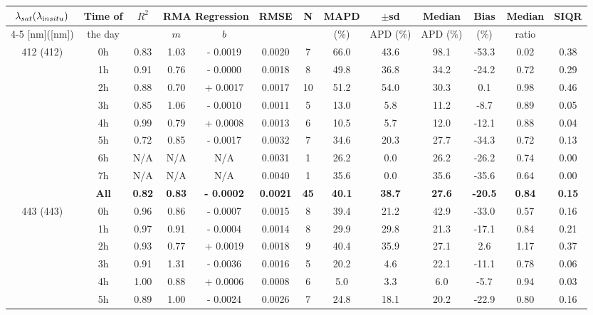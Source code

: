 \documentclass[preview]{standalone}
\begin{document}
\tiny

\tiny
\centering
\begin{tabular}{ccccccccccccc} 
 \hline 
$\lambda_{sat} (\lambda_{\text in situ})$ & Time of & $R^2$ & \multicolumn{2}{c}{RMA Regression} & RMSE & N & MAPD & $\pm$sd & Median & Bias & Median & SIQR \\ \cline{4-5}
[nm]([nm])                  &  the day            &         & $m$     & $b$     &             &     & ($\%$)  & APD ($\%$)  & APD ($\%$)  & ($\%$)   & ratio   &         \\ \hline 
\multirow{9}{*}{412 (412)} & 0h & 0.83 & 1.03 & - 0.0019 & 0.0020 &  7 & 66.0 & 43.6 & 98.1 & -53.3 & 0.02 & 0.38 \\ 
 & 1h & 0.91 & 0.76 & - 0.0000 & 0.0018 &  8 & 49.8 & 36.8 & 34.2 & -24.2 & 0.72 & 0.29 \\ 
 & 2h & 0.88 & 0.70 & + 0.0017 & 0.0017 & 10 & 51.2 & 54.0 & 30.3 & 0.1 & 0.98 & 0.46 \\ 
 & 3h & 0.85 & 1.06 & - 0.0010 & 0.0011 &  5 & 13.0 & 5.8 & 11.2 & -8.7 & 0.89 & 0.05 \\ 
 & 4h & 0.99 & 0.79 & + 0.0008 & 0.0013 &  6 & 10.5 & 5.7 & 12.0 & -12.1 & 0.88 & 0.04 \\ 
 & 5h & 0.72 & 0.85 & - 0.0017 & 0.0032 &  7 & 34.6 & 20.3 & 27.7 & -34.3 & 0.72 & 0.13 \\ 
 & 6h & N/A & N/A & N/A & 0.0031 &  1 & 26.2 & 0.0 & 26.2 & -26.2 & 0.74 & 0.00\\ 
 & 7h & N/A & N/A & N/A & 0.0040 &  1 & 35.6 & 0.0 & 35.6 & -35.6 & 0.64 & 0.00\\ \cline{2-13}
 & \textbf{All}& \textbf{0.82} & \textbf{0.83} & \textbf{- 0.0002} & \textbf{0.0021} & \textbf{45} & \textbf{40.1} & \textbf{38.7} & \textbf{27.6} & \textbf{-20.5} & \textbf{0.84} & \textbf{0.15} \\ \hline
\multirow{9}{*}{443 (443)} & 0h  & 0.96 & 0.86 & - 0.0007 & 0.0015 &  8 & 39.4 & 21.2 & 42.9 & -33.0 & 0.57 & 0.16 \\ 
 & 1h  & 0.97 & 0.91 & - 0.0004 & 0.0014 &  8 & 29.9 & 29.8 & 21.3 & -17.1 & 0.84 & 0.21 \\ 
 & 2h  & 0.93 & 0.77 & + 0.0019 & 0.0018 &  9 & 40.4 & 35.9 & 27.1 & 2.6 & 1.17 & 0.37 \\ 
 & 3h  & 0.91 & 1.31 & - 0.0036 & 0.0016 &  5 & 20.2 & 4.6 & 22.1 & -11.1 & 0.78 & 0.06 \\ 
 & 4h  & 1.00 & 0.88 & + 0.0006 & 0.0008 &  6 & 5.0 & 3.3 & 6.0 & -5.7 & 0.94 & 0.03 \\ 
 & 5h  & 0.89 & 1.00 & - 0.0024 & 0.0026 &  7 & 24.8 & 18.1 & 20.2 & -22.9 & 0.80 & 0.16 \\ 

\end{tabular}
\end{document}
